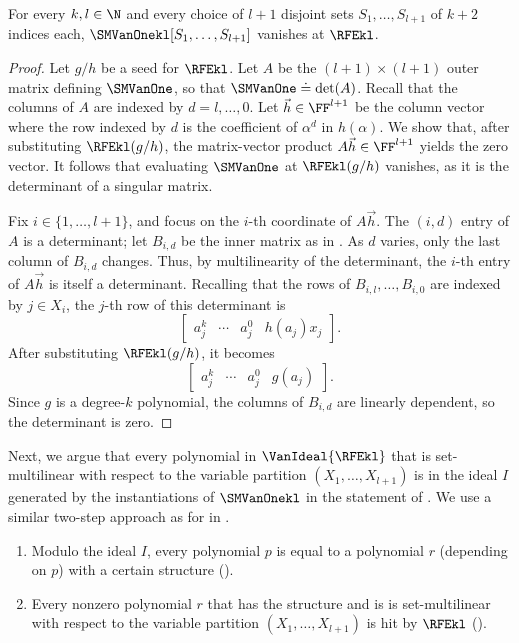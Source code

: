 \begin{lemma}
  \label{lemma.smvanone-vanishes}
  For every \(k,l \in \N\) and every choice of \(l+1\) disjoint sets
  \(S_1,\dots,S_{l+1}\) of \(k+2\) indices each,
  \(\SMVanOnekl[S_1,\dots,S_{l+1}]\) vanishes at \(\RFEkl\).
\end{lemma}
\begin{proof}
  Let \(g/h\) be a seed for \(\RFEkl\).
  Let \(A\) be the \((l+1)\times(l+1)\) outer matrix defining
  \(\SMVanOne\), so that \(\SMVanOne \doteq \det(A)\).
  Recall that the columns of \(A\) are indexed by \(d=l,\ldots,0\).
  Let \(\vec{h}\in\FF^{l+1}\) be the column vector where the row indexed by
  \(d\) is the coefficient of \(\alpha^d\) in \(h(\alpha)\).
  We show that, after substituting \(\RFEkl(g/h)\),
  the matrix-vector product \(A\vec{h}\in \FF^{l+1}\) yields the zero
  vector.
  It follows that evaluating \(\SMVanOne\) at \(\RFEkl(g/h)\) vanishes,
  as it is the determinant of a singular matrix.

  Fix \(i\in\{1,\ldots,l+1\}\), and focus on the \(i\)-th coordinate of
  \(A\vec{h}\).
  The \((i,d)\) entry of \(A\) is a determinant;
  let \(B_{i,d}\) be the inner matrix as in .
  As \(d\) varies, only the last column of \(B_{i,d}\) changes.
  Thus, by multilinearity of the determinant,
  the \(i\)-th entry of \(A\vec{h}\) is itself a determinant.
  Recalling that the rows of \(B_{i,l},\ldots,B_{i,0}\) are indexed by
  \(j\in X_i\),
  the \(j\)-th row of this determinant is
  \[
    \begin{bmatrix}
      a_j^k & \cdots & a_j^0 & h(a_j) x_j 
    \end{bmatrix}.
  \]
  After substituting \(\RFEkl(g/h)\), it becomes
  \[
    \begin{bmatrix}
      a_j^k & \cdots & a_j^0 & g(a_j) 
    \end{bmatrix}.
  \]
  Since \(g\) is a degree-\(k\) polynomial,
  the columns of $B_{i,d}$ are linearly dependent,
  so the determinant is zero.
\end{proof}

Next, we argue that every polynomial in $\VanIdeal{\RFEkl}$ that is set-multilinear with respect to the variable partition $(X_1, \dots, X_{l+1})$ is in the ideal $I$ generated by the instantiations of $\SMVanOnekl$ in the statement of . We use a similar two-step approach as for 
 in .
\begin{enumerate}
  \item Modulo the ideal $I$, every polynomial $p$ is equal to a polynomial $r$ (depending on $p$) with a certain structure ().
  \item Every nonzero polynomial $r$ that has the structure and is is set-multilinear with respect to the variable partition $(X_1, \dots, X_{l+1})$ is hit by $\RFEkl$ ().
\end{enumerate}

